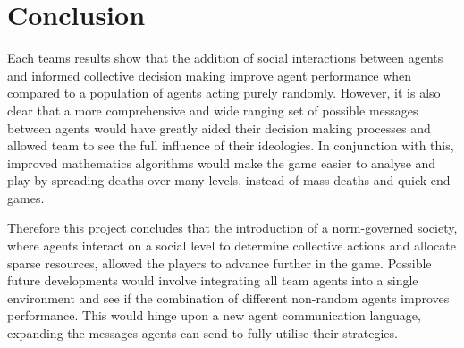 \chapter{Conclusion}\label{conclusion}

Each teams results show that the addition of social interactions between agents and informed collective decision making improve agent performance when compared to a population of agents acting purely randomly. However, it is also clear that a more comprehensive and wide ranging set of possible messages between agents would have greatly aided their decision making processes and allowed team to see the full influence of their ideologies. In conjunction with this, improved mathematics algorithms would make the game easier to analyse and play by spreading deaths over many levels, instead of mass deaths and quick end-games. 

Therefore this project concludes that the introduction of a norm-governed society, where agents interact on a social level to determine collective actions and allocate sparse resources, allowed the players to advance further in the game. Possible future developments would involve integrating all team agents into a single environment and see if the combination of different non-random agents improves performance. This would hinge upon a new agent communication language, expanding the messages agents can send to fully utilise their strategies.  


